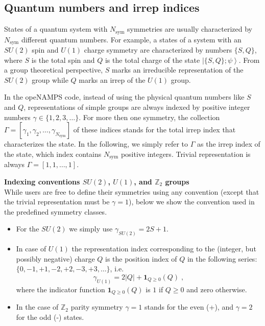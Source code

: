 \documentclass[aps,prb,twocolumn,showpacs,preprintnumbers,amsmath,amssymb, superscriptaddressm, nofootinbib]{revtex4-2}   %
\newcommand{\sym}{\mathrm{sym}}
\begin{document}
\subsection{Quantum numbers and irrep indices}
States of a quantum system with $N_\sym$ symmetries are usually characterized by $N_\sym$ different quantum numbers. For example, a states of a system with an $SU(2)$ spin and $U(1)$ charge symmetry are characterized by numbers $\lbrace S, Q \rbrace$, where $S$ is the total spin and $Q$ is the total charge of the state $\left| \lbrace S,Q \rbrace; \psi \right\rangle$. From a group theoretical perspective, $S$ marks an irreducible representation of the $SU(2)$ group while $Q$ marks an irrep of the $U(1)$ group. 

In the opeNAMPS code, instead of using the physical quantum numbers like $S$ and $Q$, representations of simple groups are always indexed by positive integer numbers $\gamma \in \lbrace 1,2,3,\dots \rbrace$. For more then one symmetry, the collection $\Gamma = \left[ \gamma_1, \gamma_2, \dots, \gamma_{N_\sym} \right]$ of these indices stands for the total irrep index that characterizes the state. In the following, we simply refer to $\Gamma$ as the irrep index of the state, which index contains $N_\sym$ positive integers. Trivial representation is always $\Gamma = [1,1,\dots,1]$.

\smallskip
\textbf{Indexing conventions $SU(2)$, $U(1)$, and $\mathbb{Z}_2$ groups} \\
While users are free to define their symmetries using any convention (except that the trivial representation must be $\gamma = 1$), below we show the convention used in the predefined symmetry classes.
\begin{itemize}
\item For the $SU(2)$ we simply use $\gamma_{SU(2)} = 2S + 1$.
\item In case of $U(1)$ the representation index corresponding to the (integer, but possibly negative) charge $Q$ is the position index of $Q$ in the following series: $\lbrace 0, -1, +1, -2, +2, -3, +3, \dots \rbrace$, i.e.
\begin{equation}
   \gamma_{U(1)} = 2 |Q| + \mathbf{1}_{Q \ge 0}(Q) \;,  
\end{equation}
where the indicator function $\mathbf{1}_{Q \ge 0}(Q)$ is $1$ if $Q \ge 0$ and zero otherwise.
\item In the case of $\mathbb{Z}_2$ parity symmetry $\gamma = 1$ stands for the even (+), and $\gamma=2$ for the odd (-) states.
\end{itemize}
\end{document}
